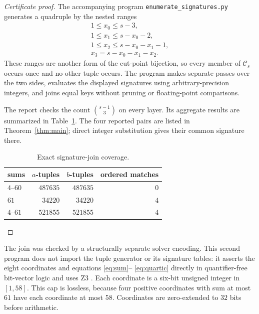 \documentclass[11pt]{article}
\begin{document}
\begin{proof}[Certificate proof]
The accompanying program \texttt{enumerate\_signatures.py} generates a
quadruple by the nested ranges
\[
 \begin{gathered}
  1\leq x_0\leq s-3,\\
  1\leq x_1\leq s-x_0-2,\\
  1\leq x_2\leq s-x_0-x_1-1,\\
  x_3=s-x_0-x_1-x_2.
 \end{gathered}
\]
These ranges are another form of the cut-point bijection, so every member of
$\mathcal C_s$ occurs once and no other tuple occurs.  The program makes
separate passes over the two sides, evaluates the displayed signatures using
arbitrary-precision integers, and joins equal keys without pruning or
floating-point comparisons.

The report checks the count $\binom{s-1}{3}$ on every layer.  Its aggregate
results are summarized in Table~\ref{tab:join}.  The four reported pairs are
listed in Theorem~\ref{thm:main}; direct integer substitution gives their
common signature there.

\begin{table}[ht]
 \centering
 \caption{Exact signature-join coverage.}
 \label{tab:join}
 \begin{tabular}{@{}lrrr@{}}
  \toprule
  sums & $a$-tuples & $b$-tuples & ordered matches \\
  \midrule
  $4$--$60$ & $487635$ & $487635$ & $0$ \\
  $61$      & $34220$  & $34220$  & $4$ \\
  \midrule
  $4$--$61$ & $521855$ & $521855$ & $4$ \\
  \bottomrule
 \end{tabular}
\end{table}
\end{proof}

The join was checked by a structurally separate solver encoding.  This second
program does not import the tuple generator or its signature tables: it
asserts the eight coordinates and equations \eqref{eq:sum}--
\eqref{eq:quartic} directly in quantifier-free bit-vector logic and uses Z3
\cite{deMouraBjorner2008}.  Each coordinate is a six-bit unsigned integer in
$[1,58]$.  This cap is lossless, because four positive coordinates with sum
at most $61$ have each coordinate at most $58$.  Coordinates are zero-extended
to $32$ bits before arithmetic.
\end{document}
